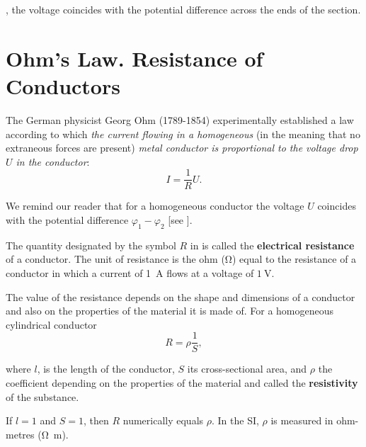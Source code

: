 \noindent
\ie, the voltage coincides with the potential difference across the ends of the section.

\section{Ohm's Law. Resistance of Conductors}\label{sec:5_4}

The German physicist Georg Ohm (1789-1854) experimentally established a law according to which \textit{the current flowing in a homogeneous} (in the meaning that no extraneous forces are present) \textit{metal conductor is proportional to the voltage drop $U$ in the conductor}:
\begin{equation}\label{eq:5_20}
    I = \frac{1}{R} U.
\end{equation}

\noindent
We remind our reader that for a homogeneous conductor the voltage $U$ coincides with the potential difference $\varphi_1-\varphi_2$ [see ].

The quantity designated by the symbol $R$ in  is called the \textbf{electrical resistance} of a conductor. The unit of resistance is the ohm (\si{\ohm}) equal to the resistance of a conductor in which a current of \SI{1}{\ampere} flows at a voltage of $\SI{1}{\volt}$.

The value of the resistance depends on the shape and dimensions of a conductor and also on the properties of the material it is made of. For a homogeneous cylindrical conductor
\begin{equation}\label{eq:5_21}
    R = \rho \frac{1}{S},
\end{equation}

\noindent
where $l$, is the length of the conductor, $S$ its cross-sectional area, and $\rho$ the coefficient depending on the properties of the material and called the \textbf{resistivity} of the substance.

If $l=1$ and $S=1$, then $R$ numerically equals $\rho$. In the SI, $\rho$ is measured in ohm-metres (\si{\ohm\metre}).

